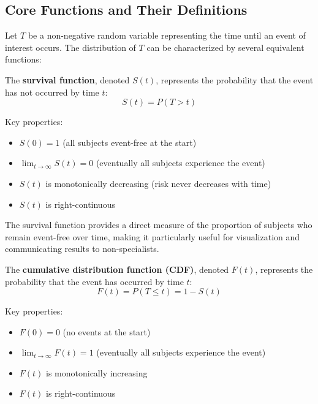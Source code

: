 \subsection{Core Functions and Their Definitions}

Let $T$ be a non-negative random variable representing the time until an event of interest occurs. The distribution of $T$ can be characterized by several equivalent functions:

\begin{definitionbox}[title=Survival Function]
The \textbf{survival function}, denoted $S(t)$, represents the probability that the event has not occurred by time $t$:
\begin{equation}
    S(t) = P(T > t)
\end{equation}

Key properties:
\begin{itemize}
    \item $S(0) = 1$ (all subjects event-free at the start)
    \item $\lim_{t \to \infty} S(t) = 0$ (eventually all subjects experience the event)
    \item $S(t)$ is monotonically decreasing (risk never decreases with time)
    \item $S(t)$ is right-continuous
\end{itemize}
\end{definitionbox}

The survival function provides a direct measure of the proportion of subjects who remain event-free over time, making it particularly useful for visualization and communicating results to non-specialists.

\begin{definitionbox}[title=Cumulative Distribution Function]
The \textbf{cumulative distribution function (CDF)}, denoted $F(t)$, represents the probability that the event has occurred by time $t$:
\begin{equation}
    F(t) = P(T \leq t) = 1 - S(t)
\end{equation}

Key properties:
\begin{itemize}
    \item $F(0) = 0$ (no events at the start)
    \item $\lim_{t \to \infty} F(t) = 1$ (eventually all subjects experience the event)
    \item $F(t)$ is monotonically increasing
    \item $F(t)$ is right-continuous
\end{itemize}
\end{definitionbox}

